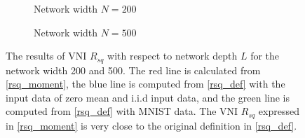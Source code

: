 \begin{figure}[h]
\centering
\newcommand{\myWidth}{0.88\textwidth}
\begin{subfigure}{\myWidth}
  \centering
  \caption{Network width $N=200$}
  \label{fig:sec4_sim2_a}
\end{subfigure}

\begin{subfigure}{\myWidth}
  \centering
  \caption{Network width $N=500$}
  \label{fig:sec4_sim2_b}
\end{subfigure}%

\caption[The results of VNI $R_{sq}$ with respect to network depth $L$.]{
The results of VNI $R_{sq}$ with respect to network depth $L$ for the network width 200 and 500. The red line is calculated from \eqref{rsq_moment}, the blue line is computed from \eqref{rsq_def} with the input data of zero mean and i.i.d input data, and the green line is computed from \eqref{rsq_def} with MNIST data.
The VNI $R_{sq}$ expressed in \eqref{rsq_moment} is very close to the original definition in \eqref{rsq_def}.
}
\label{fig:sec4_sim2}
\end{figure}
